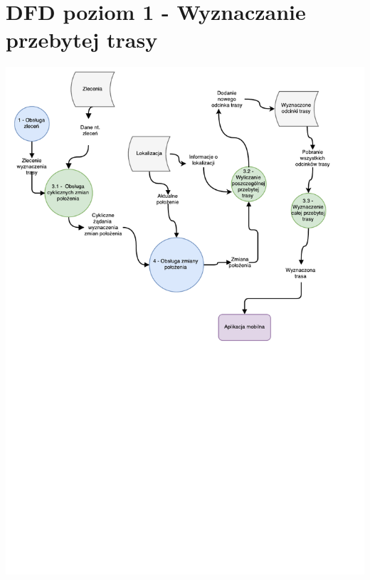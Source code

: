 \documentclass[11pt]{article}
\begin{document}
	\section{DFD poziom 1 - Wyznaczanie przebytej trasy}
	\begin{center}
		\includegraphics[scale=0.8]{DFD3.pdf}
	\end{center}
	\newpage
\end{document}
